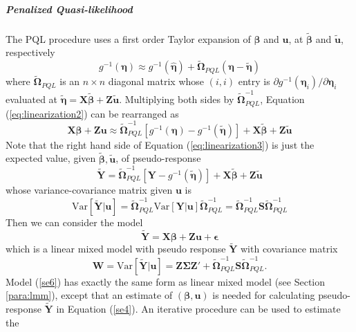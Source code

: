 \subparagraph*{Penalized Quasi-likelihood}
The PQL procedure uses a first order Taylor expansion of $\bm \beta$ and $\bm u$, at $\tilde{\bm
	\beta} $ and $ \tilde{\bm u} $, respectively
\begin{equation}\label{eq:linearization2}
	g^{-1}(\bm\eta) \approx g^{-1}(\hat{\bm \eta}) + \tilde{\bm \Omega}_{PQL}(\bm \eta-\tilde{\bm
		\eta})
\end{equation} 
where $\tilde{\bm \Omega}_{PQL}$ is an $n\times n$ diagonal matrix whose $(i, i)$ entry is 
$\partial {g^{-1}(\bm \eta_i)}/\partial \bm \eta_i $ evaluated at $\tilde{\bm \eta}= \bm X\tilde{\bm
	\beta} + \bm Z\tilde{\bm u}$. Multiplying both sides by $\bm \tilde{\bm\Omega}_{PQL}^{-1}$,
Equation
(\ref{eq:linearization2}) can be rearranged as 
\begin{equation}\label{eq:linearization3}
	\bm {X\beta} + \bm {Zu} \approx \tilde{\bm \Omega}_{PQL}^{-1}[g^{-1}(\bm\eta)- g^{-1}(\tilde{\bm
		\eta})]  + \bm{X}\tilde{\bm \beta} + \bm Z\tilde{\bm u}
\end{equation}
Note that the right hand side of Equation (\ref{eq:linearization3}) is just the expected value,
given $\tilde{\bm \beta}, \tilde{\bm u}$, of	 pseudo-response 
\begin{equation}\label{se4}
	\tilde{\bm Y }=\tilde{\bm \Omega}_{PQL}^{-1}[\bm Y- g^{-1}(\tilde{\bm \eta})]  + \bm{X}\tilde{\bm
		\beta} + \bm Z\tilde{\bm u}
\end{equation}
whose variance-covariance matrix given $\bm u$ is 
\begin{equation}\label{se5}
	\text{Var}[\tilde{\bm Y }|\bm u] =\tilde{\bm \Omega}_{PQL}^{-1} \text{Var}[\bm Y|\bm u]\tilde{\bm
		\Omega}_{PQL}^{-1} = 
	\tilde{\bm \Omega}_{PQL}^{-1} \bm S \tilde{\bm \Omega}_{PQL}^{-1}
\end{equation}
Then we can consider the model 
\begin{equation}\label{se6}
	\tilde{\bm Y } = \bm{X\beta} + \bm {Zu}  + \bm \epsilon
\end{equation}
which is a linear mixed model with pseudo response $\tilde{\bm Y }$ with covariance matrix 
\begin{equation}
	\bm W = \text{Var}[ \tilde{\bm Y } |\bm u] = \bm{Z\Sigma Z'} + \tilde{\bm \Omega}_{PQL}^{-1} \bm S
	\tilde{\bm \Omega}_{PQL}^{-1}.
\end{equation}
Model (\ref{se6})  has exactly the same form as linear mixed model (see Section \ref{para:lmm}),
except that an estimate of $(\bm\beta, \bm u)$  is needed for calculating pseudo-response
$\tilde{\bm Y }$ in Equation (\ref{se4}). An iterative procedure can be used to estimate the
